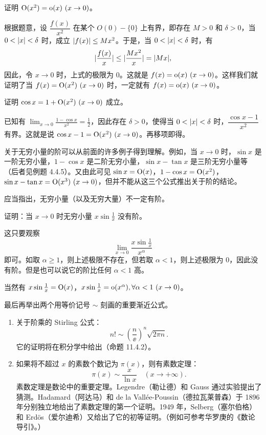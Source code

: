\begin{xexample}[4.4.1]
证明 $\bigO(x^2)=\littleo(x)\ (x\to0)$。
\end{xexample}
\begin{xproof}
根据题意，设 $\dfrac{f(x)}{x^2}$ 在某个 $O(0)-\{0\}$ 上有界，即存在 $M>0$ 和 $\delta>0$，当 $0<\lvert x\rvert<\delta$ 时，成立 $\lvert f(x)\rvert\leq Mx^2$。于是，当 $0<\lvert x\rvert<\delta$ 时，有
\[
  \lvert\frac{f(x)}x\rvert\leq\lvert\frac{Mx^2}x\rvert=\lvert Mx\rvert,
\]
因此，令 $x\to0$ 时，上式的极限为 0。这就是 $f(x)=\littleo(x)\ (x\to0)$。这样我们就证明了当 $f(x)=\mathrm{O}(x^2)\ (x\to0)$ 时，一定就有 $f(x)=\littleo(x)\ (x\to0)$。
\end{xproof}

\begin{xexample}[4.4.2]
证明 $\cos x=1+\mathrm{O}(x^2)\ (x\to0)$ 成立。
\end{xexample}
\begin{xproof}
已知有 $\displaystyle\lim_{x\to0}\frac{1-\cos x}{x^2}=\frac12$，因此存在 $\delta>0$，使得当 $0<\lvert x\rvert<\delta$ 时，$\dfrac{\cos x-1}{x^2}$ 有界。这就是说 $\cos x-1=\bigO(x^2)\ (x\to0)$。再移项即得。
\end{xproof}

关于无穷小量的阶可以从前面的许多例子得到理解。例如，当 $x\to0$ 时，$\sin x$ 是一阶无穷小量，$1-\cos x$ 是二阶无穷小量，$\sin x-\tan x$ 是三阶无穷小量等（后者见例题 4.4.5）。又由此可见 $\sin x=\mathrm{O}(x)$，$1-\cos x=\mathrm{O}(x^2)$，$\sin x-\tan x=\bigO(x^3)\ (x\to0)$，但并不能从这三个公式推出关于阶的结论。

应当指出，无穷小量（以及无穷大量）不一定有阶。

\begin{xexample}[4.4.3]
证明：当 $x\to0$ 时无穷小量 $x\sin\frac1x$ 没有阶。
\end{xexample}
\begin{xproof}
这只要观察
\[
  \lim_{x\to0}\frac{x\sin\frac1x}{x^\alpha}
\]
即可。如取 $\alpha\geq1$，则上述极限不存在，但若取 $\alpha<1$，则上述极限为 0，因此没有阶。但是也可以说它的阶比任何 $\alpha<1$ 高。
\end{xproof}

当然有 $x\sin\frac1x=\mathrm{O}(x)$，$x\sin\frac1x=\littleo(x^\alpha),\forall\alpha<1\ (x\to0)$。

最后再举出两个用等价记号 $\sim$ 刻画的重要渐近公式。

\begin{enumerate}
  \item 关于阶乘的 Stirling 公式：
  \[
    n!\sim\left(\frac n\ee\right)^n\sqrt{2\pi n}.
  \]
  它的证明将在积分学中给出（命题 11.4.2）。
  \item 如果将不超过 $x$ 的素数个数记为 $\pi(x)$，则有素数定理：
  \[
    \pi(x)\sim\frac{x}{\ln x}\quad(x\to+\infty).
  \]
  素数定理是数论中的重要定理。Legendre（勒让德）和 Gauss 通过实验提出了猜测。Hadamard（阿达马）和 de la Vallée-Poussin（德拉瓦莱普森）于 1896 年分别独立地给出了素数定理的第一个证明。1949 年，Selberg（塞尔伯格）和 Erdös（爱尔迪希）又给出了它的初等证明。（例如可参考华罗庚的《数论导引》。）
\end{enumerate}

